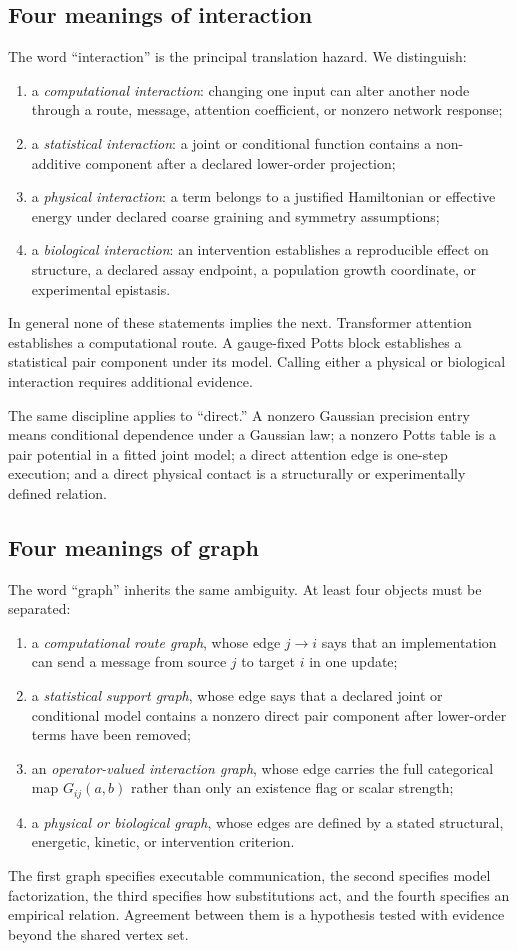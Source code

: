 \documentclass[10pt]{article}
\theoremstyle{definition}
\theoremstyle{remark}
\newcommand{\BookSection}[1]{\subsection{#1}}
\begin{document}
\BookSection{Four meanings of interaction}

The word ``interaction'' is the principal translation hazard.  We distinguish:
\begin{enumerate}
\setlength{\itemsep}{1pt}
\item a \emph{computational interaction}: changing one input can alter another node through a
route, message, attention coefficient, or nonzero network response;
\item a \emph{statistical interaction}: a joint or conditional function contains a non-additive
component after a declared lower-order projection;
\item a \emph{physical interaction}: a term belongs to a justified Hamiltonian or effective
energy under declared coarse graining and symmetry assumptions;
\item a \emph{biological interaction}: an intervention establishes a reproducible effect on
structure, a declared assay endpoint, a population growth coordinate, or experimental epistasis.
\end{enumerate}
In general none of these statements implies the next.  Transformer attention establishes a
computational route.  A gauge-fixed Potts block establishes a statistical pair component under its
model.  Calling either a physical or biological interaction requires additional evidence.

The same discipline applies to ``direct.''  A nonzero Gaussian precision entry means conditional
dependence under a Gaussian law; a nonzero Potts table is a pair potential in a fitted joint model;
a direct attention edge is one-step execution; and a direct physical contact is a structurally or
experimentally defined relation.

\BookSection{Four meanings of graph}

The word ``graph'' inherits the same ambiguity.  At least four objects must be separated:
\begin{enumerate}
\setlength{\itemsep}{1pt}
\item a \emph{computational route graph}, whose edge $j\to i$ says that an implementation can send
a message from source $j$ to target $i$ in one update;
\item a \emph{statistical support graph}, whose edge says that a declared joint or conditional
model contains a nonzero direct pair component after lower-order terms have been removed;
\item an \emph{operator-valued interaction graph}, whose edge carries the full categorical map
$G_{ij}(a,b)$ rather than only an existence flag or scalar strength;
\item a \emph{physical or biological graph}, whose edges are defined by a stated structural,
energetic, kinetic, or intervention criterion.
\end{enumerate}
The first graph specifies executable communication, the second specifies model factorization, the
third specifies how substitutions act, and the fourth specifies an empirical relation.  Agreement
between them is a hypothesis tested with evidence beyond the shared vertex set.
\end{document}
